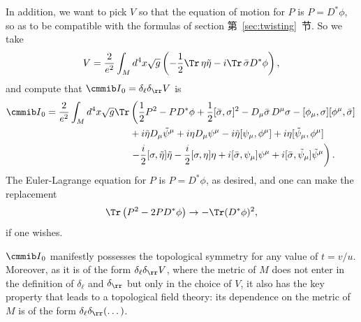 In addition, we want to pick $V$ so that the equation of motion
for $P$ is $P=D^*\phi$, so as to be compatible with the formulas
of section 第~\ref{sec:twisting}~节.  So we take %
\setcounter{equation}{37}
\begin{equation}\label{eq:obo}
V={2\over e^2}\int_M
d^4x\sqrt g\left(-{1\over 2}\Tr\,\eta\tilde\eta -i\Tr\,\bar\sigma
D^*\phi\right),
\end{equation}
 and compute that ${\cmmib
I}_0=\delta_\ell\delta_\rr V$ is %
\setcounter{equation}{38}
\begin{equation}\label{eq:nobo}
\begin{aligned}{{\cmmib
I}}_0= {2\over e^2}\int_Md^4x\sqrt g\Tr& \left({1\over 2}P^2
-PD^*\phi+{1\over 2}[\bar\sigma,\sigma]^2-
D_\mu\bar\sigma\,D^\mu\sigma
-[\phi_\mu,\sigma][\phi^\mu,\bar\sigma]\right.\\ & + i\tilde\eta
D_\mu\tilde\psi^\mu+i\eta
D_\mu\psi^\mu-i\tilde\eta[\psi_\mu,\phi^\mu]+i\eta[\tilde\psi_\mu,\phi^\mu]
\\ &\left.-{i\over 2}[\sigma,\tilde\eta]\tilde\eta -{i\over
2}[\sigma,\eta]\eta+i[\bar\sigma,\psi_\mu]\psi^\mu
+i[\bar\sigma,\tilde\psi_\mu]\tilde\psi^\mu\right).\\\end{aligned}
\end{equation}
 The
Euler-Lagrange equation for $P$ is $P=D^*\phi$, as desired, and
one can make the replacement %
\setcounter{equation}{39}
\begin{equation}\label{eq:olgog}
\Tr\left(
P^2-2PD^*\phi\right)\to-\Tr (D^*\phi)^2,
\end{equation}
 if one wishes.

${{\cmmib I}}_0$ manifestly possesses the topological symmetry for
any value of $t=v/u$.  Moreover, as it is of the form
$\delta_\ell\delta_\rr V$, where the metric of $M$ does not enter
in the definition of $\delta_\ell$ and $\delta_\rr $ but only in
the choice of $V$, it also has the key property that leads to a
topological field theory: its dependence on the metric of $M$ is
of the form $\delta_\ell\delta_\rr (\dots)$.

